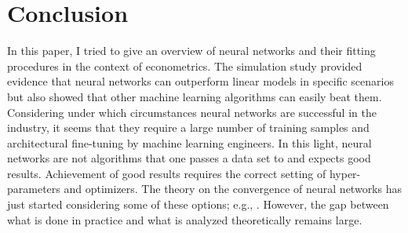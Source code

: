 \section{Conclusion}
\label{seq:conclusion}

In this paper, I tried to give an overview of neural networks and their fitting
procedures in the context of econometrics. The simulation study provided evidence that
neural networks can outperform linear models in specific scenarios but also showed that
other machine learning algorithms can easily beat them. Considering under which
circumstances neural networks are successful in the industry, it seems that they require
a large number of training samples and architectural fine-tuning by machine learning
engineers. In this light, neural networks are not algorithms that one passes a data set
to and expects good results. Achievement of good results requires the correct setting of
hyper-parameters and optimizers. The theory on the convergence of neural networks has
just started considering some of these options; e.g., \cite{Braun.2019}. However, the
gap between what is done in practice and what is analyzed theoretically remains large.
